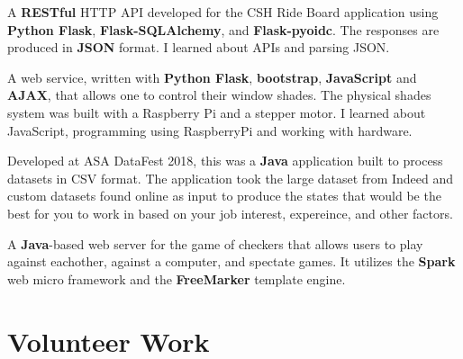 \documentclass[]{deedy-resume-openfont}
\begin{document}
\begin{minipage}[t]{0.66\textwidth}
A \textbf{RESTful} HTTP API developed for the CSH Ride Board application using \textbf{Python Flask}, \textbf{Flask-SQLAlchemy}, and \textbf{Flask-pyoidc}. The responses are produced in \textbf{JSON} format. I learned about APIs and parsing JSON.
\sectionsep

A web service, written with \textbf{Python Flask}, \textbf{bootstrap}, \textbf{JavaScript} and \textbf{AJAX}, that allows one to control their window shades. The physical shades system was built with a Raspberry Pi and a stepper motor. I learned about JavaScript, programming using RaspberryPi and working with hardware.
\sectionsep

\location{}
Developed at ASA DataFest 2018, this was a \textbf{Java} application built to process datasets in CSV format.
The application took the large dataset from Indeed and custom datasets found online as input to produce the states that would be the best for you to work in based on your job interest, expereince, and other factors.
\sectionsep

\location{}
A \textbf{Java}-based web server for the game of checkers that allows users to play against eachother, against a computer, and spectate games. It utilizes the \textbf{Spark} web micro framework and the \textbf{FreeMarker} template engine.
\sectionsep



\section{Volunteer Work}

\sectionsep


\end{minipage}
\end{document}
